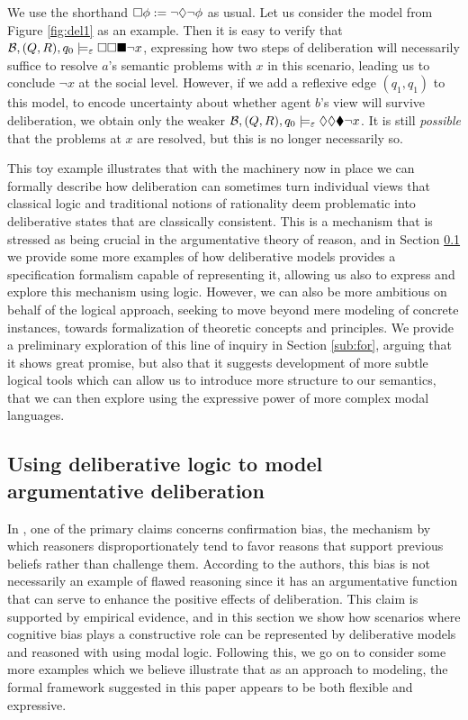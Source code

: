 \documentclass[greybox]{svmult}
\newcommand{\views}{\mathcal B}
\newcommand{\sem}{\varepsilon}
\begin{document}
We use the shorthand $\square \phi := \neg \lozenge \neg \phi$ as usual. Let us consider the model from Figure \ref{fig:del1} as an example. Then it is easy to verify that $\views, (Q,R), q_0 \models_\sem \abox \abox \cbox \neg x$, expressing how two steps of deliberation will necessarily suffice to resolve $a$'s semantic problems with $x$ in this scenario, leading us to conclude $\neg x$ at the social level. However, if we add a reflexive edge $(q_1,q_1)$ to this model, to encode uncertainty about whether agent $b$'s view will survive deliberation, we obtain only the weaker $\views, (Q,R),q_0 \models_\sem \adia \adia \cdia \neg x$. It is still \emph{possible} that the problems at $x$ are resolved, but this is no longer necessarily so.

This toy example illustrates that with the machinery now in place we can formally describe how deliberation can sometimes turn individual views that classical logic and traditional notions of rationality deem problematic into deliberative states that are classically consistent. This is a mechanism that is stressed as being crucial in the argumentative theory of reason, and in Section \ref{sec:examples} we provide some more examples of how deliberative models provides a specification formalism capable of representing it, allowing us also to express and explore this mechanism using logic. However, we can also be more ambitious on behalf of the logical approach, seeking to move beyond mere modeling of concrete instances, towards formalization of theoretic concepts and principles. We provide a preliminary exploration of this line of inquiry in Section \ref{sub:for}, arguing that it shows great promise, but also that it suggests development of more subtle logical tools which can allow us to introduce more structure to our semantics, that we can then explore using the expressive power of more complex modal languages. 

\subsection{Using deliberative logic to model argumentative deliberation}\label{sec:examples}

In \cite{mercier}, one of the primary claims concerns confirmation bias, the mechanism by which reasoners disproportionately tend to favor reasons that support previous beliefs rather than challenge them. According to the authors, this bias is not necessarily an example of flawed reasoning since it has an argumentative function that can serve to enhance the positive effects of deliberation. This claim is supported by empirical evidence, and in this section we show how scenarios where cognitive bias plays a constructive role can be represented by deliberative models and reasoned with using modal logic. Following this, we go on to consider some more examples which we believe illustrate that as an approach to modeling, the formal framework suggested in this paper appears to be both flexible and expressive. 
\end{document}
